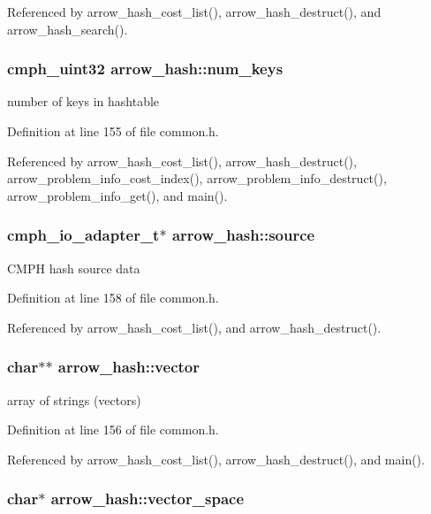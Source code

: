 Referenced by arrow\_\-hash\_\-cost\_\-list(), arrow\_\-hash\_\-destruct(), and arrow\_\-hash\_\-search().\hypertarget{structarrow__hash_f75ec1b9382f5b646007f8acb0521c15}{
\subsubsection[{num\_\-keys}]{\setlength{\rightskip}{0pt plus 5cm}cmph\_\-uint32 {\bf arrow\_\-hash::num\_\-keys}}}
\label{structarrow__hash_f75ec1b9382f5b646007f8acb0521c15}


number of keys in hashtable 

Definition at line 155 of file common.h.

Referenced by arrow\_\-hash\_\-cost\_\-list(), arrow\_\-hash\_\-destruct(), arrow\_\-problem\_\-info\_\-cost\_\-index(), arrow\_\-problem\_\-info\_\-destruct(), arrow\_\-problem\_\-info\_\-get(), and main().\hypertarget{structarrow__hash_202a3f5b2689ae35543ef2c7ea84a6c2}{
\subsubsection[{source}]{\setlength{\rightskip}{0pt plus 5cm}cmph\_\-io\_\-adapter\_\-t$\ast$ {\bf arrow\_\-hash::source}}}
\label{structarrow__hash_202a3f5b2689ae35543ef2c7ea84a6c2}


CMPH hash source data 

Definition at line 158 of file common.h.

Referenced by arrow\_\-hash\_\-cost\_\-list(), and arrow\_\-hash\_\-destruct().\hypertarget{structarrow__hash_91eeed74d32d354b4e8b03be8b51f058}{
\subsubsection[{vector}]{\setlength{\rightskip}{0pt plus 5cm}char$\ast$$\ast$ {\bf arrow\_\-hash::vector}}}
\label{structarrow__hash_91eeed74d32d354b4e8b03be8b51f058}


array of strings (vectors) 

Definition at line 156 of file common.h.

Referenced by arrow\_\-hash\_\-cost\_\-list(), arrow\_\-hash\_\-destruct(), and main().\hypertarget{structarrow__hash_298c5f151d99d62d6be200a620a4b4c3}{
\subsubsection[{vector\_\-space}]{\setlength{\rightskip}{0pt plus 5cm}char$\ast$ {\bf arrow\_\-hash::vector\_\-space}}}
\label{structarrow__hash_298c5f151d99d62d6be200a620a4b4c3}



